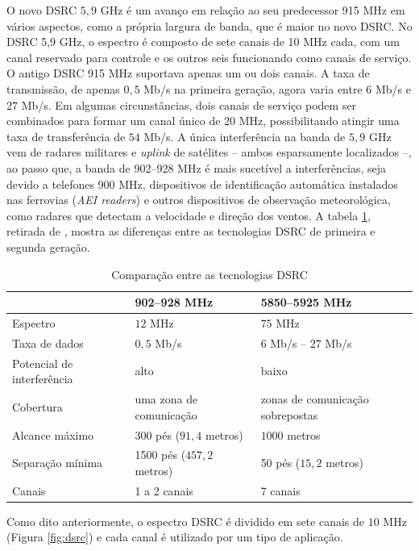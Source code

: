 O novo DSRC $5,9$ GHz é um avanço em relação ao seu predecessor 915 MHz em
vários aspectos, como a própria largura de banda, que é maior no novo DSRC. No
DSRC 5,9 GHz, o espectro é composto de sete canais de 10 MHz cada, com um canal
reservado para controle e os outros seis funcionando como canais de serviço. O
antigo DSRC 915 MHz suportava apenas um ou dois canais. A taxa de transmissão,
de apenas $0,5$ Mb/s na primeira geração, agora varia entre $6$ Mb/s e $27$
Mb/s. Em algumas circunstâncias, dois canais de serviço podem ser combinados
para formar um canal único de 20 MHz, possibilitando atingir uma taxa de
transferência de $54$ Mb/s. A única interferência na banda de $5,9$ GHz vem de
radares militares e \textit{uplink} de satélites -- ambos esparsamente
localizados --, ao passo que, a banda de 902--928 MHz é mais sucetível a 
interferências, seja devido a telefones 900 MHz, dispositivos de identificação 
automática instalados nas ferrovias (\textit{AEI readers}) e outros dispositivos 
de observação meteorológica, como radares que detectam a velocidade e direção 
dos ventos.  A tabela \ref{tab:dsrccomparison}, retirada de \cite{guo2006vehicular}, 
mostra as diferenças entre as tecnologias DSRC de primeira e segunda geração.

\begin{table}[htbp]
		\centering
		\begin{tabular}{l l l}
		\toprule
		& 902--928 MHz & 5850--5925 MHz\\
		\midrule
		Espectro & $12$ MHz & $75$ MHz\\
		Taxa de dados  & $0,5$ Mb/s & $6$ Mb/s -- $27$ Mb/s \\
		Potencial de interferência & alto & baixo \\
		Cobertura & uma zona de comunicação & zonas de comunicação sobrepostas\\
		Alcance máximo & $300$ pés ($91,4$ metros) & $1000$ metros\\
		Separação mínima & 1500 pés ($457,2$ metros) & 50 pés ($15,2$ metros)\\
		Canais & 1 a 2 canais & 7 canais\\
		\bottomrule
		\end{tabular}
\caption{Comparação entre as tecnologias DSRC}
 \label{tab:dsrccomparison}
\end{table}

Como dito anteriormente, o espectro DSRC é dividido em sete canais 
de $10$ MHz (Figura \ref{fig:dsrc}) e cada canal é utilizado por um
tipo de aplicação.


